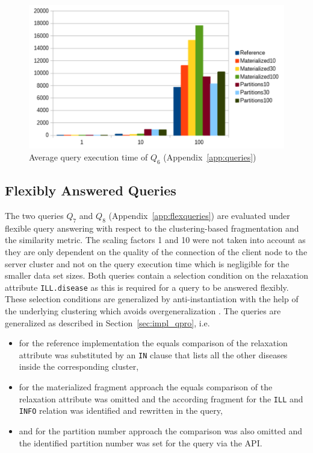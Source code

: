 \begin{figure}[h]
    \centering
    \includegraphics[scale=0.8]{charts/Query6.pdf}
    \caption{Average query execution time of $Q_6$ (Appendix~\ref{app:queries})}
    \label{fig:query6}
\end{figure}


\subsection{Flexibly Answered Queries}
\label{sec:res_faq}

The two queries $Q_7$ and $Q_8$ (Appendix~\ref{app:flexqueries}) are evaluated under flexible query answering with respect to the clustering-based fragmentation
and the similarity metric. The scaling factors 1 and 10 were not taken into account as they are only dependent on the quality of the connection of the client node
to the server cluster and not on the query execution time which is negligible for the smaller data set sizes. Both queries contain a selection condition on the
relaxation attribute \verb!ILL.disease! as this is required for a query to be answered flexibly. These selection conditions are generalized by anti-instantiation
with the help of the underlying clustering which avoids overgeneralization \citep{Wiese2014}. The queries are generalized as described in 
Section~\ref{sec:impl_qpro}, i.e. 
\begin{itemize}
    \item for the reference implementation the equals comparison of the relaxation attribute was substituted by an \verb!IN! clause that
        lists all the other diseases inside the corresponding cluster,
    \item for the materialized fragment approach the equals comparison of the relaxation attribute was omitted and the according fragment for the \verb!ILL! and 
        \verb!INFO! relation was identified and rewritten in the query,
    \item and for the partition number approach the comparison was also omitted and the identified partition number was set for the query via the API.
\end{itemize}

